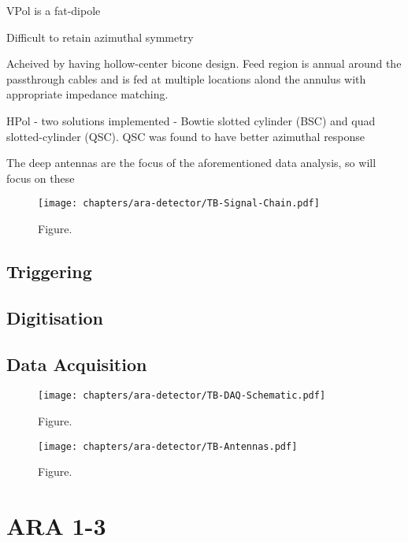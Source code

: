 VPol is a fat-dipole

Difficult to retain azimuthal symmetry

Acheived by having hollow-center bicone design. Feed region is annual around the passthrough cables and is fed at multiple locations alond the annulus with appropriate impedance matching.

HPol - two solutions implemented - Bowtie slotted cylinder (BSC) and quad slotted-cylinder (QSC). QSC was found to have better azimuthal response




The deep antennas are the focus of the aforementioned data analysis, so will focus on these





\begin{figure}[htpb]
  \centering
  \texttt{[image: chapters/ara-detector/TB-Signal-Chain.pdf]}
  \caption{Figure.}
  \label{fig:ara-detector:TestBed:Signal-Chain}
\end{figure}



\subsection{Triggering}
\label{sec:ara-detector:TestBed:Triggering}

\subsection{Digitisation}
\label{sec:ara-detector:TestBed:Digitisation}

\subsection{Data Acquisition}
\label{sec:ara-detector:TestBed:Data-Acquisition}

\begin{figure}[htpb]
  \centering
  \texttt{[image: chapters/ara-detector/TB-DAQ-Schematic.pdf]}
  \caption{Figure.}
  \label{fig:ara-detector:TestBed:DAQ-Schematic}
\end{figure}

\begin{figure}[htpb]
  \centering
  \texttt{[image: chapters/ara-detector/TB-Antennas.pdf]}
  \caption{Figure.}
  \label{fig:ara-detector:TestBed:Antennas}
\end{figure}





\section{ARA 1-3}
\label{sec:ara-detector:ARA1-3}

